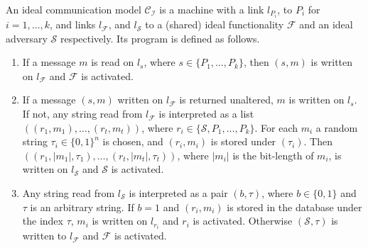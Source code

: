 \documentclass{acm_proc_article-sp}
\begin{document}
\begin{definition}
An ideal communication model $\mathcal{C_I}$ is a machine with a link $l_{P_i}$, to
$P_i$ for $i = 1, \ldots, k$,
and links $l_\mathcal{F}$, and $l_\mathcal{S}$ to a (shared) ideal functionality $\mathcal{F}$
and an ideal adversary $\mathcal{S}$ respectively. Its program is defined as follows.
\begin{enumerate}
  \item If a message $m$ is read on $l_s$, where $s \in \{P_1, \ldots, P_k\}$,
        then $(s, m)$ is written on $l_\mathcal{F}$ and $\mathcal{F}$ is activated.
  \item If a message $(s, m)$ written on $l_\mathcal{F}$ is returned unaltered, $m$ is
        written on $l_s$. If not, any string read from $l_\mathcal{F}$ is interpreted
        as a list $((r_1, m_1), \ldots, (r_t, m_t))$, where $r_i \in \{\mathcal{S},
        P_1, \ldots, P_k\}$. For each $m_i$ a random string $\tau_i \in \{0, 1\}^n$ is
        chosen, and $(r_i, m_i)$ is stored under $(\tau_i)$. Then $((r_1, |m_1|, \tau_1),
        \ldots, (r_t, |m_t|, \tau_t))$, where $|m_i|$ is the bit-length of $m_i$, is
        written on $l_\mathcal{S}$ and $\mathcal{S}$ is activated.
  \item Any string read from $l_\mathcal{S}$ is interpreted as a pair $(b, \tau)$, where
        $b \in \{0, 1\}$ and $\tau$ is an arbitrary string. If $b = 1$ and $(r_i, m_i)$
        is stored in the database under the index $\tau$, $m_i$ is written on $l_{r_i}$
        and $r_i$ is activated. Otherwise $(\mathcal{S}, \tau)$ is written to
       $l_\mathcal{F}$ and $\mathcal{F}$ is activated.
\end{enumerate}
\end{definition}
\end{document}
